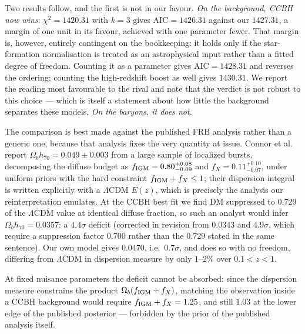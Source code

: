 \documentclass[11pt]{article}
\begin{document}
Two results follow, and the first is not in our favour. \emph{On the background, CCBH now wins}:
$\chi^2 = 1420.31$ with $k=3$ gives $\mathrm{AIC} = 1426.31$ against our $1427.31$, a margin of one
unit in its favour, achieved with one parameter fewer. That margin is, however, entirely contingent
on the bookkeeping: it holds only if the star-formation normalisation is treated as an
astrophysical input rather than a fitted degree of freedom. Counting it as a parameter gives
$\mathrm{AIC} = 1428.31$ and reverses the ordering; counting the high-redshift boost as well gives
$1430.31$. We report the reading most favourable to the rival and note that the verdict is not
robust to this choice --- which is itself a statement about how little the background separates
these models. \emph{On the baryons, it does not.}

The comparison is best made against the published FRB analysis rather than a generic one, because
that analysis fixes the very quantity at issue. Connor et al.\ \cite{Connor2025} report
$\Omega_b h_{70} = 0.049 \pm 0.003$ from a large sample of localized bursts, decomposing the
diffuse budget as $f_{\rm IGM} = 0.80^{+0.08}_{-0.09}$ and $f_X = 0.11^{+0.10}_{-0.07}$, under
uniform priors with the hard constraint $f_{\rm IGM} + f_X \leq 1$; their dispersion integral is
written explicitly with a $\Lambda$CDM $E(z)$, which is precisely the analysis our reinterpretation
emulates. At the CCBH best fit we find $\mathrm{DM}$ suppressed to $0.729$ of the $\Lambda$CDM
value at identical diffuse fraction, so such an analyst would infer
$\Omega_b h_{70} = 0.0357$: a $4.4\sigma$ deficit (corrected in revision from $0.0343$ and $4.9\sigma$, which
require a suppression factor $0.700$ rather than the $0.729$ stated in the same sentence). Our own model gives $0.0470$, i.e.\ $0.7\sigma$,
and does so with no freedom, differing from $\Lambda$CDM in dispersion measure by only
$1$--$2\%$ over $0.1 < z < 1$.

At fixed nuisance parameters the deficit cannot be absorbed: since the dispersion measure
constrains the product $\Omega_b(f_{\rm IGM}+f_X)$, matching the observation inside a CCBH
background would require $f_{\rm IGM} + f_X = 1.25$, and still $1.03$ at the lower edge of the
published posterior --- forbidden by the prior of the published analysis itself.
\end{document}
